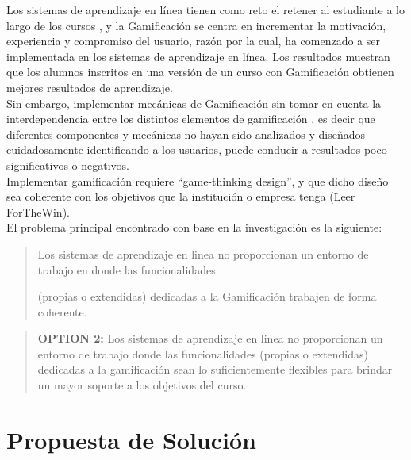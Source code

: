 Los sistemas de aprendizaje en línea tienen como reto el retener al estudiante a lo largo de los cursos \cite{DropOut}, y la Gamificación se centra en incrementar la motivación, experiencia y compromiso del usuario, razón por la cual, ha comenzado a ser implementada en los sistemas de aprendizaje en línea. Los resultados muestran que los alumnos inscritos en una versión de un curso con Gamificación obtienen mejores resultados de aprendizaje. \cite{GamInE-Learning}\\
    
\noindent Sin embargo, implementar mecánicas de Gamificación sin tomar en cuenta la interdependencia entre los distintos elementos de gamificación \cite{FrameWorkForTheWin}, es decir que diferentes componentes y mecánicas no hayan sido analizados y diseñados cuidadosamente identificando a los usuarios, puede conducir a resultados poco significativos o negativos. \cite{Wood-Reiners}\\

 Implementar gamificación requiere ``game-thinking design'', y que dicho diseño sea coherente con los objetivos que la institución o empresa tenga (Leer ForTheWin).\\
    
    \noindent El problema principal encontrado con base en la investigación es la siguiente:
    
    \begin{quote}
    \colorbox{blue!05}{\parbox{\dimexpr\linewidth-2\fboxsep}{\strut%
        Los sistemas de aprendizaje en linea no proporcionan un entorno de
        trabajo en donde las funcionalidades\par (propias o extendidas) 
        dedicadas a la Gamificación trabajen de forma coherente\cite{coherencia}.
    \strut}}%
    \end{quote}

    \begin{quote}
    \colorbox{blue!05}{\parbox{\dimexpr\linewidth-2\fboxsep}{\strut%
    {\bf\color{red} OPTION 2:}%
        Los sistemas de aprendizaje en linea no proporcionan un entorno
        de trabajo donde las funcionalidades (propias o extendidas) dedicadas
        a la gamificación sean lo suficientemente flexibles para brindar un
        mayor soporte a los objetivos del curso.
    \strut}}%
    \end{quote}
\clearpage

\section{Propuesta de Solución}
\label{sec:propuesta}


